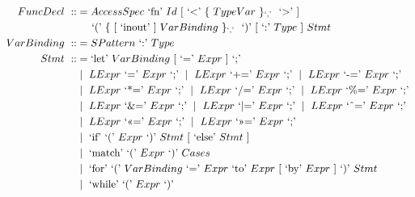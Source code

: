 \documentclass[letterpaper]{article}
\newcommand{\nonterminal}[1]{#1\ }
\newcommand{\terminal}[1]{\text{`#1'}\ }
\newcommand{\gramOption}[1]{[\ #1]\ }
\newcommand*{\gramRepeat}[2][]{\{\ #2\}_{#1}\ }
\newcommand{\gramOr}{\mid\ }
\begin{document}
\begin{align*}
%
  \nonterminal{FuncDecl} ::&=
    \nonterminal{AccessSpec} \terminal{fn} \nonterminal{Id}
      \gramOption{\terminal{\textless}
        \gramRepeat[\terminal{,}]{\nonterminal{TypeVar}} \terminal{\textgreater}} \\
    &\hspace{.5cm}
      \terminal{(} \gramRepeat[\terminal{,}]{\gramOption{\terminal{inout}}
        \nonterminal{VarBinding}} \terminal{)}
      \gramOption{\terminal{:} \nonterminal{Type}} \nonterminal{Stmt} \\
%
  \nonterminal{VarBinding} ::&= \nonterminal{SPattern} \terminal{:} \nonterminal{Type} \\
%
  \nonterminal{Stmt} ::&=
    \terminal{let} \nonterminal{VarBinding}
      \gramOption{\terminal{=} \nonterminal{Expr}} \terminal{;} \\
    &\gramOr \nonterminal{LExpr} \terminal{=} \nonterminal{Expr} \terminal{;}
     \gramOr \nonterminal{LExpr} \terminal{+=} \nonterminal{Expr} \terminal{;}
     \gramOr \nonterminal{LExpr} \terminal{-=} \nonterminal{Expr} \terminal{;} \\
    &\gramOr \nonterminal{LExpr} \terminal{*=} \nonterminal{Expr} \terminal{;}
     \gramOr \nonterminal{LExpr} \terminal{/=} \nonterminal{Expr} \terminal{;}
     \gramOr \nonterminal{LExpr} \terminal{\%=} \nonterminal{Expr} \terminal{;} \\
    &\gramOr \nonterminal{LExpr} \terminal{\&=} \nonterminal{Expr} \terminal{;}
     \gramOr \nonterminal{LExpr} \terminal{\textbar=} \nonterminal{Expr} \terminal{;}
     \gramOr \nonterminal{LExpr} \terminal{\^{}=} \nonterminal{Expr} \terminal{;} \\
    &\gramOr \nonterminal{LExpr} \terminal{\textless\textless=} \nonterminal{Expr} \terminal{;}
     \gramOr \nonterminal{LExpr} \terminal{\textgreater\textgreater=} \nonterminal{Expr} \terminal{;} \\
    &\gramOr \terminal{if} \terminal{(} \nonterminal{Expr} \terminal{)}
      \nonterminal{Stmt} \gramOption{\terminal{else} \nonterminal{Stmt}} \\
    &\gramOr \terminal{match} \terminal{(} \nonterminal{Expr} \terminal{)} \nonterminal{Cases} \\
    &\gramOr \terminal{for} \terminal{(} \nonterminal{VarBinding} \terminal{=}
      \nonterminal{Expr} \terminal{to} \nonterminal{Expr}
      \gramOption{\terminal{by} \nonterminal{Expr}} \terminal{)} \nonterminal{Stmt} \\
    &\gramOr \terminal{while} \terminal{(} \nonterminal{Expr} \terminal{)}

\end{align*}
\end{document}
